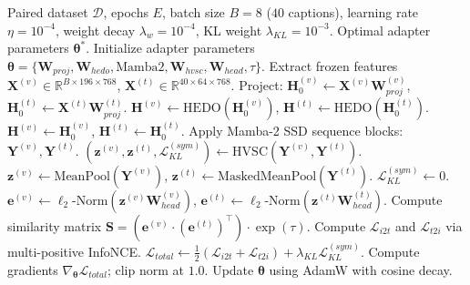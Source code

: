 \documentclass[journal]{IEEEtran}
\begin{document}
\begin{algorithm}[t]
\caption{HEDO-HVSC Native Mamba-2 Training Pipeline}
\label{alg:training_loop}
\begin{algorithmic}[1]
\REQUIRE Paired dataset $\mathcal{D}$, epochs $E$, batch size $B=8$ ($40$ captions), learning rate $\eta=10^{-4}$, weight decay $\lambda_w=10^{-4}$, KL weight $\lambda_{KL}=10^{-3}$.
\ENSURE Optimal adapter parameters $\boldsymbol{\theta}^*$.
\STATE Initialize adapter parameters $\boldsymbol{\theta} = \{\mathbf{W}_{proj}, \mathbf{W}_{hedo}, \text{Mamba2}, \mathbf{W}_{hvsc}, \mathbf{W}_{head}, \tau\}$.
        \STATE Extract frozen features $\mathbf{X}^{(v)} \in \mathbb{R}^{B \times 196 \times 768}$, $\mathbf{X}^{(t)} \in \mathbb{R}^{40 \times 64 \times 768}$.
        \STATE Project: $\mathbf{H}_0^{(v)} \leftarrow \mathbf{X}^{(v)} \mathbf{W}_{proj}^{(v)}$, $\mathbf{H}_0^{(t)} \leftarrow \mathbf{X}^{(t)} \mathbf{W}_{proj}^{(t)}$.
            \STATE $\mathbf{H}^{(v)} \leftarrow \text{HEDO}(\mathbf{H}_0^{(v)})$, $\mathbf{H}^{(t)} \leftarrow \text{HEDO}(\mathbf{H}_0^{(t)})$.
        \ELSE
            \STATE $\mathbf{H}^{(v)} \leftarrow \mathbf{H}_0^{(v)}$, $\mathbf{H}^{(t)} \leftarrow \mathbf{H}_0^{(t)}$.
        \ENDIF
        \STATE Apply Mamba-2 SSD sequence blocks: $\mathbf{Y}^{(v)}, \mathbf{Y}^{(t)}$.
            \STATE $(\mathbf{z}^{(v)}, \mathbf{z}^{(t)}, \mathcal{L}_{KL}^{(sym)}) \leftarrow \text{HVSC}(\mathbf{Y}^{(v)}, \mathbf{Y}^{(t)})$.
        \ELSE
            \STATE $\mathbf{z}^{(v)} \leftarrow \text{MeanPool}(\mathbf{Y}^{(v)})$, $\mathbf{z}^{(t)} \leftarrow \text{MaskedMeanPool}(\mathbf{Y}^{(t)})$.
            \STATE $\mathcal{L}_{KL}^{(sym)} \leftarrow 0$.
        \ENDIF
        \STATE $\mathbf{e}^{(v)} \leftarrow \ell_2\text{-Norm}(\mathbf{z}^{(v)} \mathbf{W}_{head}^{(v)})$, $\mathbf{e}^{(t)} \leftarrow \ell_2\text{-Norm}(\mathbf{z}^{(t)} \mathbf{W}_{head}^{(t)})$.
        \STATE Compute similarity matrix $\mathbf{S} = (\mathbf{e}^{(v)} \cdot (\mathbf{e}^{(t)})^\top) \cdot \exp(\tau)$.
        \STATE Compute $\mathcal{L}_{i2t}$ and $\mathcal{L}_{t2i}$ via multi-positive InfoNCE.
        \STATE $\mathcal{L}_{total} \leftarrow \frac{1}{2}(\mathcal{L}_{i2t} + \mathcal{L}_{t2i}) + \lambda_{KL} \mathcal{L}_{KL}^{(sym)}$.
        \STATE Compute gradients $\nabla_{\boldsymbol{\theta}} \mathcal{L}_{total}$; clip norm at $1.0$.
        \STATE Update $\boldsymbol{\theta}$ using AdamW with cosine decay.
    \ENDFOR
\ENDFOR
\end{algorithmic}
\end{algorithm}
\end{document}
